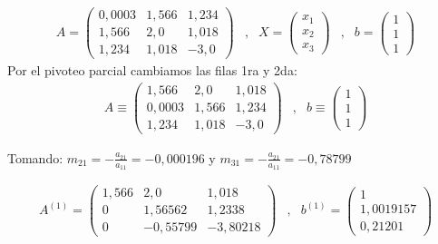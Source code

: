 \begin{equation*}
    \begin{matrix}
        A=\begin{pmatrix}
            0,0003 & 1,566 & 1,234 \\
            1,566 & 2,0 & 1,018 \\
            1,234 & 1,018 & -3,0
        \end{pmatrix}
        & , &
        X=\begin{pmatrix}
            x_1 \\
            x_2 \\
            x_3
        \end{pmatrix} 
        & , &
        b=\begin{pmatrix}
            1 \\
            1 \\
            1
        \end{pmatrix}
    \end{matrix}
\end{equation*}
Por el pivoteo parcial cambiamos las filas 1ra y 2da:\\
\begin{equation*}
    \begin{matrix}
        A\equiv \begin{pmatrix}
            1,566 & 2,0 & 1,018 \\
            0,0003 & 1,566 & 1,234 \\
            1,234 & 1,018 & -3,0
        \end{pmatrix}
        & , &
        b\equiv \begin{pmatrix}
            1 \\
            1 \\
            1
        \end{pmatrix}
    \end{matrix}
\end{equation*}

Tomando: $m_{21}=-\frac{a_{21}}{a_{11}}=-0,000196$ y $m_{31}=-\frac{a_{21}}{a_{11}}=-0,78799$

\begin{equation*}
    \begin{matrix}
        A^{(1)}= \begin{pmatrix}
            1,566 & 2,0 & 1,018 \\
            0 & 1,56562 & 1,2338 \\
            0 & -0,55799 & -3,80218
        \end{pmatrix}
        & , &
        b^{(1)}=\begin{pmatrix}
            1 \\
            1,0019157 \\
            0,21201
        \end{pmatrix}
    \end{matrix}
\end{equation*}

